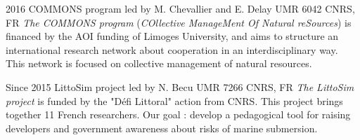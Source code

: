 \documentclass[]{cv-etienne}
\begin{document}
\begin{entrylist}
\entry
{2016}
{COMMONS program {\normalfont led by M. Chevallier and E. Delay}}
{UMR 6042 CNRS, FR}
{\emph{The COMMONS program} (\textit{COllective ManageMent Of Natural reSources}) is financed by the AOI funding of Limoges University, and aims to structure an international research network about cooperation in an interdisciplinary way. This network is focused on collective management of natural resources.}
\end{entrylist}
\begin{entrylist}
\entry
{Since 2015}
{LittoSim project {\normalfont led by N. Becu}}
{UMR 7266 CNRS, FR}
{\emph{The LittoSim project} is funded by the "Défi Littoral" action from CNRS. This project brings together 11 French researchers. Our goal : develop a pedagogical tool for raising developers and government awareness about risks of marine submersion.}
\end{entrylist}
\end{document}

